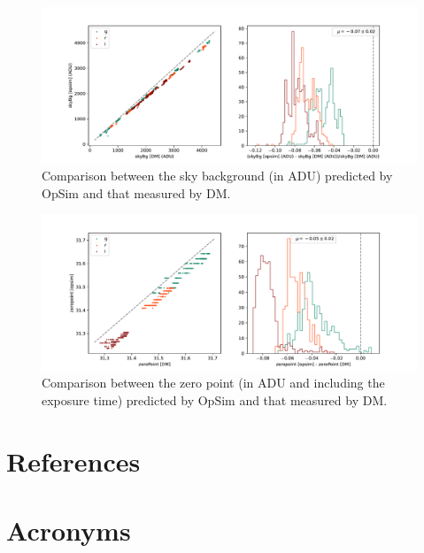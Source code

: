 \documentclass[DM,authoryear,toc]{lsstdoc}
\begin{document}
\begin{figure}
    \includegraphics[width=\textwidth]{figures/or4_opsim_sky.pdf}
    \caption{\label{fig:opsim_sky} Comparison between the sky background (in ADU) predicted by OpSim and that measured by DM.}
\end{figure}

\begin{figure}
    \includegraphics[width=\textwidth]{figures/or4_opsim_zeropoint.pdf}
    \caption{\label{fig:opsim_zp} Comparison between the zero point (in ADU and including the exposure time) predicted by OpSim and that measured by DM.}
\end{figure}

\clearpage



\section{References} \label{sec:bib}
\renewcommand{\refname}{} %


\section{Acronyms} \label{sec:acronyms}

\end{document}
